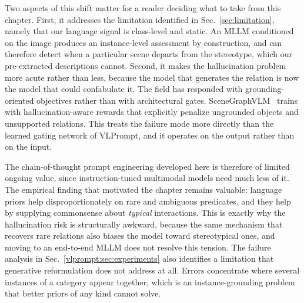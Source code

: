 Two aspects of this shift matter for a reader deciding what to take from this chapter. First, it addresses the limitation identified in Sec.~\ref{sec:limitation}, namely that our language signal is class-level and static. An MLLM conditioned on the image produces an instance-level assessment by construction, and can therefore detect when a particular scene departs from the stereotype, which our pre-extracted descriptions cannot. Second, it makes the hallucination problem more acute rather than less, because the model that generates the relation is now the model that could confabulate it. The field has responded with grounding-oriented objectives rather than with architectural gates. SceneGraphVLM~\citep{makarov2026scenegraphvlm} trains with hallucination-aware rewards that explicitly penalize ungrounded objects and unsupported relations. This treats the failure mode more directly than the learned gating network of VLPrompt, and it operates on the output rather than on the input.

The chain-of-thought prompt engineering developed here is therefore of limited ongoing value, since instruction-tuned multimodal models need much less of it. The empirical finding that motivated the chapter remains valuable: language priors help disproportionately on rare and ambiguous predicates, and they help by supplying commonsense about \emph{typical} interactions. This is exactly why the hallucination risk is structurally awkward, because the same mechanism that recovers rare relations also biases the model toward stereotypical ones, and moving to an end-to-end MLLM does not resolve this tension. The failure analysis in Sec.~\ref{vlprompt:sec:experiments} also identifies a limitation that generative reformulation does not address at all. Errors concentrate where several instances of a category appear together, which is an instance-grounding problem that better priors of any kind cannot solve.
